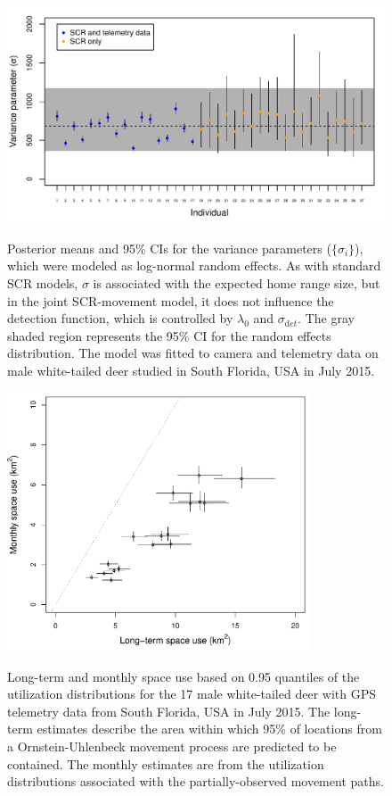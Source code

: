 \documentclass[12pt]{article}
\begin{document}
\begin{figure}[h!]
  \centering
  \includegraphics[width=\textwidth]{figs/sigma-re} \\
  \caption{Posterior means and 95\% CIs for the variance parameters
    ($\{\sigma_i\}$), which were modeled as log-normal random
    effects. As with standard SCR models, $\sigma$ is associated with
    the expected home range size, but in the joint SCR-movement model, it
    does not influence the detection function, which is controlled by
    $\lambda_0$ and $\sigma_{\mathrm  det}$. 
    The gray shaded region represents the 95\% CI for the random effects 
    distribution. The model was fitted to camera and telemetry data on
    male white-tailed deer studied in South Florida, USA in July 2015.} 
  \label{fig:sigma}
\end{figure}



\clearpage

\begin{figure}[h!]
  \centering
  \includegraphics[width=0.8\textwidth]{figs/hr-e-r} \\
  \caption{Long-term and monthly space use based
    on 0.95 quantiles of the utilization distributions for the 17
    male white-tailed deer with GPS telemetry data from South Florida,
    USA in July 2015. The long-term estimates describe the
    area within which 95\% of locations from a Ornstein-Uhlenbeck
    movement process are {predicted} to be contained. The
    monthly estimates are from the utilization distributions
    associated with the partially-observed movement paths. } 
  \label{fig:hr}
\end{figure}
\end{document}
